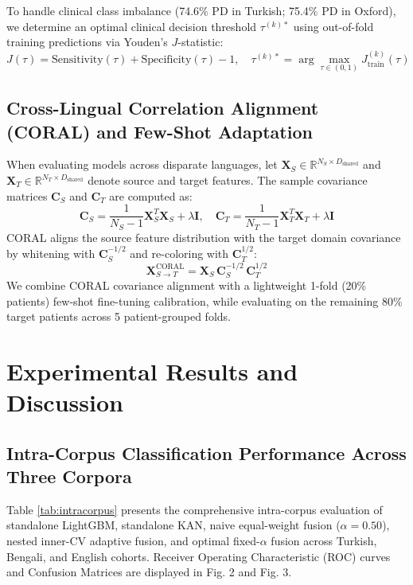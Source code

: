 \documentclass[journal,10pt,twoside]{IEEEtran}
\begin{document}
To handle clinical class imbalance (74.6\% PD in Turkish; 75.4\% PD in Oxford), we determine an optimal clinical decision threshold $\tau^{(k)*}$ using out-of-fold training predictions via Youden's $J$-statistic:
\begin{equation}
J(\tau) = \text{Sensitivity}(\tau) + \text{Specificity}(\tau) - 1, \quad \tau^{(k)*} = \arg\max_{\tau \in (0, 1)} J_{\text{train}}^{(k)}(\tau)
\end{equation}

\subsection{Cross-Lingual Correlation Alignment (CORAL) and Few-Shot Adaptation}
When evaluating models across disparate languages, let $\mathbf{X}_S \in \mathbb{R}^{N_S \times D_{\text{shared}}}$ and $\mathbf{X}_T \in \mathbb{R}^{N_T \times D_{\text{shared}}}$ denote source and target features. The sample covariance matrices $\mathbf{C}_S$ and $\mathbf{C}_T$ are computed as:
\begin{equation}
\mathbf{C}_S = \frac{1}{N_S - 1} \mathbf{X}_S^T \mathbf{X}_S + \lambda \mathbf{I}, \quad \mathbf{C}_T = \frac{1}{N_T - 1} \mathbf{X}_T^T \mathbf{X}_T + \lambda \mathbf{I}
\end{equation}
CORAL \cite{ref19} aligns the source feature distribution with the target domain covariance by whitening with $\mathbf{C}_S^{-1/2}$ and re-coloring with $\mathbf{C}_T^{1/2}$:
\begin{equation}
\mathbf{X}_{S \to T}^{\text{CORAL}} = \mathbf{X}_S \, \mathbf{C}_S^{-1/2} \, \mathbf{C}_T^{1/2}
\end{equation}
We combine CORAL covariance alignment with a lightweight 1-fold (20\% patients) few-shot fine-tuning calibration, while evaluating on the remaining 80\% target patients across 5 patient-grouped folds.

\section{Experimental Results and Discussion}

\subsection{Intra-Corpus Classification Performance Across Three Corpora}
Table \ref{tab:intracorpus} presents the comprehensive intra-corpus evaluation of standalone LightGBM, standalone KAN, naive equal-weight fusion ($\alpha = 0.50$), nested inner-CV adaptive fusion, and optimal fixed-$\alpha$ fusion across Turkish, Bengali, and English cohorts. Receiver Operating Characteristic (ROC) curves and Confusion Matrices are displayed in Fig. 2 and Fig. 3.
\end{document}
